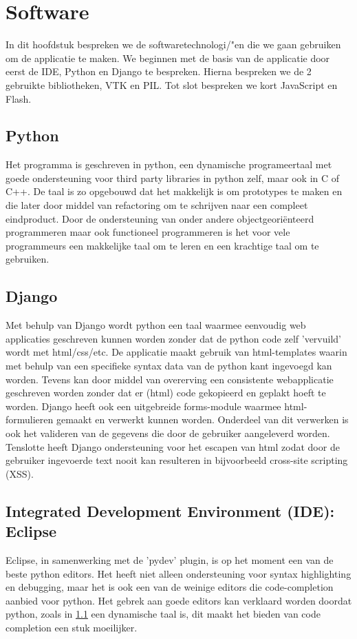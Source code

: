 \section{Software}
\label{Software}
In dit hoofdstuk bespreken we de softwaretechnologi/"{e}n die we gaan gebruiken om de applicatie te maken.
We beginnen met de basis van de applicatie door eerst de IDE, Python en Django te bespreken.
Hierna bespreken we de 2 gebruikte bibliotheken, VTK en PIL.
Tot slot bespreken we kort JavaScript en Flash.

\subsection{Python}
\label{software_python}
Het programma is geschreven in python, een dynamische programeertaal met goede ondersteuning voor third party libraries in python zelf, maar ook in C of C++. De taal is zo opgebouwd dat het makkelijk is om prototypes te maken en die later door middel van refactoring om te schrijven naar een compleet eindproduct. Door de ondersteuning van onder andere objectgeori\"{e}nteerd programmeren maar ook functioneel programmeren is het voor vele programmeurs een makkelijke taal om te leren en een krachtige taal om te gebruiken.

\subsection{Django}
Met behulp van Django wordt python een taal waarmee eenvoudig web applicaties geschreven kunnen worden zonder dat de python code zelf 'vervuild' wordt met html/css/etc. De applicatie maakt gebruik van html-templates waarin met behulp van een specifieke syntax data van de python kant ingevoegd kan worden. Tevens kan door middel van overerving een consistente webapplicatie geschreven worden zonder dat er (html) code gekopieerd en geplakt hoeft te worden. Django heeft ook een uitgebreide forms-module waarmee html-formulieren gemaakt en verwerkt kunnen worden. Onderdeel van dit verwerken is ook het valideren van de gegevens die door de gebruiker aangeleverd worden. Tenslotte heeft Django ondersteuning voor het escapen van html zodat door de gebruiker ingevoerde text nooit kan resulteren in bijvoorbeeld cross-site scripting (XSS).

\subsection{Integrated Development Environment (IDE): Eclipse}
Eclipse, in samenwerking met de 'pydev' plugin, is op het moment een van de beste python editors. Het heeft niet alleen ondersteuning voor syntax highlighting en debugging, maar het is ook een van de weinige editors die code-completion aanbied voor python. Het gebrek aan goede editors kan verklaard worden doordat python, zoals in \ref{software_python} een dynamische taal is, dit maakt het bieden van code completion een stuk moeilijker.

